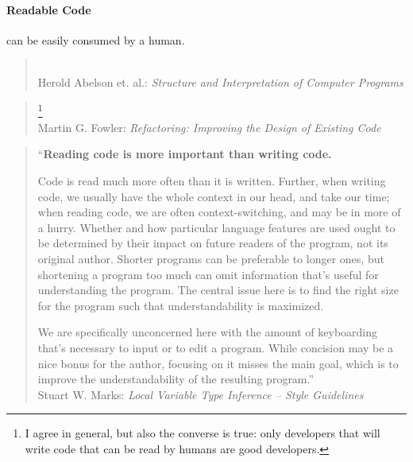 \paragraph{Readable Code} can be easily consumed by a human.

\begin{quote}
	\\
	Herold Abelson et. al.: \textit{Structure and Interpretation of Computer Programs} \autocite{Sussman:StructureAndInterpretationOfComputerPrograms}
\end{quote}

\begin{quote}
	\footnote{I agree in general, but also the converse is true: only developers that will write code that can be read by humans are good developers.} \\
	Martin G. Fowler: \textit{Refactoring: Improving the Design of Existing Code} \autocite{Fowler:Refactoring}
\end{quote}

\begin{quote}
	``\textbf{Reading code is more important than writing code.}

	Code is read much more often than it is written. Further, when writing code, we usually have the whole context in our head, and take our time; when reading code, we are often context-switching, and may be in more of a hurry. Whether and how particular language features are used ought to be determined by their impact on future readers of the program, not its original author. Shorter programs can be preferable to longer ones, but shortening a program too much can omit information that's useful for understanding the program. The central issue here is to find the right size for the program such that understandability is maximized.

	We are specifically unconcerned here with the amount of keyboarding that’s necessary to input or to edit a program. While concision may be a nice bonus for the author, focusing on it misses the main goal, which is to improve the understandability of the resulting program.'' \\
	Stuart W. Marks: \textit{Local Variable Type Inference – Style Guidelines} \autocite{Marks:LocalVariableTypeInference:ReadingIsMoreImportantThanWriting}
\end{quote}

